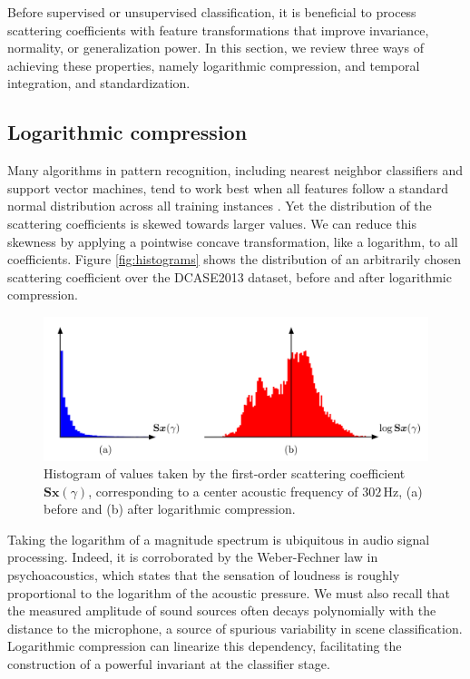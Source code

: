 \documentclass[journal]{IEEEtran}
\begin{document}
Before supervised or unsupervised classification, it is beneficial to process scattering coefficients with feature transformations that improve invariance, normality, or generalization power.
In this section, we review three ways of achieving these properties, namely logarithmic compression, and temporal integration, and standardization.

\subsection{Logarithmic compression}
\label{sec:logcomp}

Many algorithms in pattern recognition, including nearest neighbor classifiers and support vector machines, tend to work best when all features follow a standard normal distribution across all training instances \cite{Hsu2003}.
Yet the distribution of the scattering coefficients is skewed towards larger values. We can reduce this skewness by applying a pointwise concave transformation, like a logarithm, to all coefficients.
Figure \ref{fig:histograms} shows the distribution of an arbitrarily chosen scattering coefficient over the DCASE2013 dataset, before and after logarithmic compression.

\begin{figure}
\begin{center}
\includegraphics[width=\columnwidth]{compression.png}
\caption{
\label{fig:histograms}
Histogram of values taken by the first-order scattering coefficient $\mathbf{S}\boldsymbol{x}(\gamma)$, corresponding to a center acoustic frequency of $302\,\mathrm{Hz}$,
(a) before and (b) after logarithmic compression.}
\label{fig:compression}
\end{center}
\end{figure}


Taking the logarithm of a magnitude spectrum is ubiquitous in audio signal processing.
Indeed, it is corroborated by the Weber-Fechner law in psychoacoustics, which states that the sensation of loudness is roughly proportional to the logarithm of the acoustic pressure. 
We must also recall that the measured amplitude of sound sources often decays polynomially with the distance to the microphone, a source of spurious variability in scene classification.
Logarithmic compression can linearize this dependency, facilitating the construction of a powerful invariant at the classifier stage.
\end{document}
